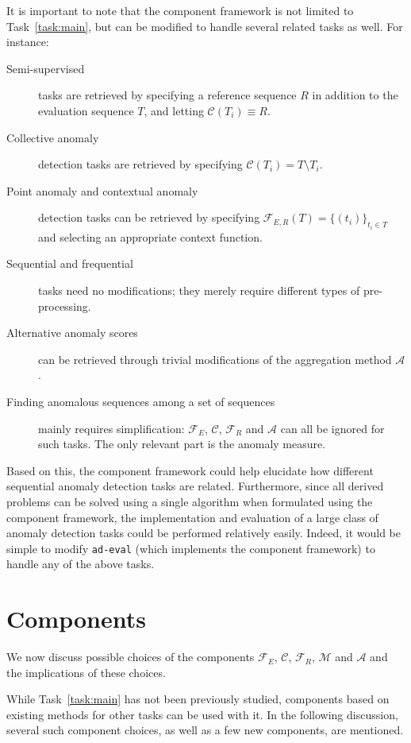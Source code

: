 It is important to note that the component framework is not limited to Task~\ref{task:main}, but can be modified to handle several related tasks as well. For instance:
\begin{description}
    \item[Semi-supervised] tasks are retrieved by specifying a reference sequence $R$ in addition to the evaluation sequence $T$, and letting $\mathcal{C}(T_i) \equiv R$.
    \item[Collective anomaly] detection tasks are retrieved by specifying $\mathcal{C}(T_i) = T \setminus T_i$.
    \item[Point anomaly and contextual anomaly] detection tasks can be retrieved by specifying $\mathcal{F}_{E,R}(T) = {\{(t_i)\}}_{t_i \in T}$ and selecting an appropriate context function.
    \item[Sequential and frequential] tasks need no modifications; they merely require different types of pre-processing.
    \item[Alternative anomaly scores] can be retrieved through trivial modifications of the aggregation method $\mathcal{A}$.
    \item[Finding anomalous sequences among a set of sequences] mainly requires simplification: $\mathcal{F}_E$, $\mathcal{C}$, $\mathcal{F}_R$ and $\mathcal{A}$ can all be ignored for such tasks. The only relevant part is the anomaly measure.
\end{description}

Based on this, the component framework could help elucidate how different sequential anomaly detection tasks are related. Furthermore, since all derived problems can be solved using a single algorithm when formulated using the component framework, the implementation and evaluation of a large class of anomaly detection tasks could be performed relatively easily. Indeed, it would be simple to modify \texttt{ad-eval} (which implements the component framework) to handle any of the above tasks.

\section{Components}
\label{sect:deriving_problems}

We now discuss possible choices of the components $\mathcal{F}_E$, $\mathcal{C}$, $\mathcal{F}_R$, $\mathcal{M}$ and $\mathcal{A}$ and the implications of these choices.

While Task~\ref{task:main} has not been previously studied, components based on existing methods for other tasks can be used with it. In the following discussion, several such component choices, as well as a few new components, are mentioned.

